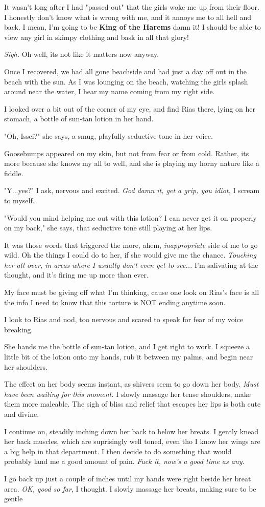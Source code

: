 \documentclass{article}
\begin{document}
It wasn't long after I had "passed out" that the girls woke me up from their floor. I honestly don't know what is wrong with me, and it annoys me to all hell and back. I mean, I'm going to be \textbf{King of the Harems} damn it! I should be able to view any girl in skimpy clothing and bask in all that glory!

\emph{Sigh.} Oh well, its not like it matters now anyway.

Once I recovered, we had all gone beachside and had just a day off out in the beach with the sun. As I was lounging on the beach, watching the girls splash around near the water, I hear my name coming from my right side.

I looked over a bit out of the corner of my eye, and find Rias there, lying on her stomach, a bottle of sun-tan lotion in her hand.

"Oh, Issei?" she says, a smug, playfully seductive tone in her voice.

Goosebumps appeared on my skin, but not from fear or from cold. Rather, its more because she knows my all to well, and she is playing my horny nature like a fiddle.
 
"Y...yes?" I ask, nervous and excited. \emph{God damn it, get a grip, you idiot,} I scream to myself.

"Would you mind helping me out with this lotion? I can never get it on properly on my back," she says, that seductive tone still playing at her lips.

It was those words that triggered the more, ahem, \emph{inappropriate} side of me to go wild. Oh the things I could do to her, if she would give me the chance. \emph{Touching her all over, in areas where I usually don't even get to see...} I'm salivating at the thought, and it's firing me up more than ever.

My face must be giving off what I'm thinking, cause one look on Rias's face is all the info I need to know that this torture is NOT ending anytime soon.

I look to Rias and nod, too nervous and scared to speak for fear of my voice breaking. 

She hands me the bottle of sun-tan lotion, and I get right to work. I squeeze a little bit of the lotion onto my hands, rub it between my palms, and begin near her shoulders. 

The effect on her body seems instant, as shivers seem to go down her body. \emph{Must have been waiting for this moment.} I slowly massage her tense shoulders, make them more maleable. The sigh of bliss and relief that escapes her lips is both cute and divine.

I continue on, steadily inching down her back to below her breats. I gently knead her back muscles, which are suprisingly well toned, even tho I know her wings are a big help in that department. I then decide to do something that would probably land me a good amount of pain. \emph{Fuck it, now's a good time as any}.

I go back up just a couple of inches until my hands were right beside her breat area. \emph{OK, good so far}, I thought. I slowly massage her breats, making sure to be gentle
\end{document}
